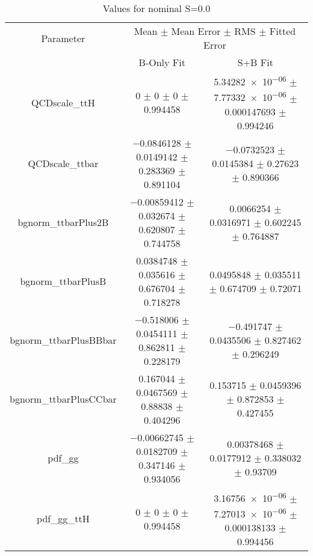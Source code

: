 \begin{table}
\centering
\caption{Values for nominal S=0.0}
\begin{tabular}{ccc}
\toprule
Parameter & \multicolumn{2}{c}{Mean $\pm$ Mean Error $\pm$ RMS $\pm$ Fitted Error}\\
 & B-Only Fit & S+B Fit\\
\midrule
QCDscale\_ttH & \num{0} $\pm$ \num{0} $\pm$ \num{0} $\pm$ \num{0.994458} & \num{5.34282e-06} $\pm$ \num{7.77332e-06} $\pm$ \num{0.000147693} $\pm$ \num{0.994246}\\
QCDscale\_ttbar & \num{-0.0846128} $\pm$ \num{0.0149142} $\pm$ \num{0.283369} $\pm$ \num{0.891104} & \num{-0.0732523} $\pm$ \num{0.0145384} $\pm$ \num{0.27623} $\pm$ \num{0.890366}\\
bgnorm\_ttbarPlus2B & \num{-0.00859412} $\pm$ \num{0.032674} $\pm$ \num{0.620807} $\pm$ \num{0.744758} & \num{0.0066254} $\pm$ \num{0.0316971} $\pm$ \num{0.602245} $\pm$ \num{0.764887}\\
bgnorm\_ttbarPlusB & \num{0.0384748} $\pm$ \num{0.035616} $\pm$ \num{0.676704} $\pm$ \num{0.718278} & \num{0.0495848} $\pm$ \num{0.035511} $\pm$ \num{0.674709} $\pm$ \num{0.72071}\\
bgnorm\_ttbarPlusBBbar & \num{-0.518006} $\pm$ \num{0.0454111} $\pm$ \num{0.862811} $\pm$ \num{0.228179} & \num{-0.491747} $\pm$ \num{0.0435506} $\pm$ \num{0.827462} $\pm$ \num{0.296249}\\
bgnorm\_ttbarPlusCCbar & \num{0.167044} $\pm$ \num{0.0467569} $\pm$ \num{0.88838} $\pm$ \num{0.404296} & \num{0.153715} $\pm$ \num{0.0459396} $\pm$ \num{0.872853} $\pm$ \num{0.427455}\\
pdf\_gg & \num{-0.00662745} $\pm$ \num{0.0182709} $\pm$ \num{0.347146} $\pm$ \num{0.934056} & \num{0.00378468} $\pm$ \num{0.0177912} $\pm$ \num{0.338032} $\pm$ \num{0.93709}\\
pdf\_gg\_ttH & \num{0} $\pm$ \num{0} $\pm$ \num{0} $\pm$ \num{0.994458} & \num{3.16756e-06} $\pm$ \num{7.27013e-06} $\pm$ \num{0.000138133} $\pm$ \num{0.994456}\\
\bottomrule
\end{tabular}
\end{table}
